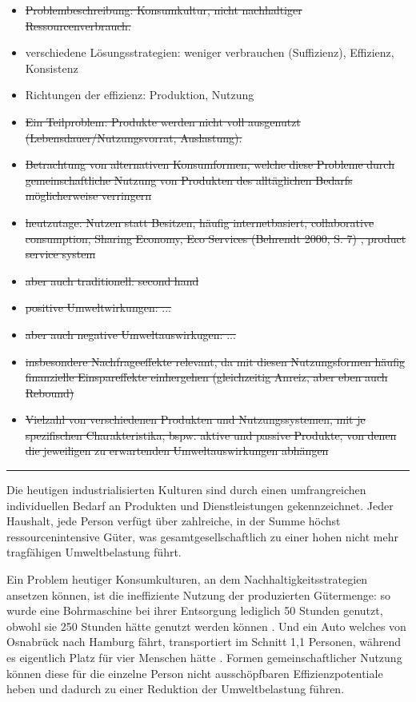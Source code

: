 \documentclass[11pt, titlepage=true]{scrartcl} %
\begin{document}
\begin{itemize}
  \item \sout{Problembeschreibung: Konsumkultur, nicht nachhaltiger
        Ressourcenverbrauch. }
  \item verschiedene Lösungsstrategien: weniger verbrauchen (Suffizienz),
    Effizienz, Konsistenz 
  \item Richtungen der effizienz: Produktion, Nutzung
  \item \sout{Ein Teilproblem: Produkte werden nicht voll ausgenutzt
    (Lebensdauer/Nutzungsvorrat, Auslastung).  }
  \item \sout{Betrachtung von alternativen Konsumformen, welche diese
      Probleme durch
      gemeinschaftliche Nutzung von Produkten des alltäglichen Bedarfs
    möglicherweise verringern}
  \item \sout{heutzutage: Nutzen statt Besitzen, häufig internetbasiert,
      collaborative
      consumption, Sharing Economy, Eco Services (Behrendt 2000, S. 7) ,
    product service system }
  \item \sout{aber auch traditionell: second hand}
  \item \sout{positive Umweltwirkungen: ...  }
  \item \sout{aber auch negative Umweltauswirkugen: ...  }
  \item \sout{insbesondere Nachfrageeffekte relevant, da mit
      diesen Nutzungsformen häufig finanzielle Einspareffekte einhergehen
    (gleichzeitig Anreiz, aber eben auch Rebound)}
  \item \sout{Vielzahl von verschiedenen Produkten und Nutzungssystemen,
      mit je spezifischen Charakteristika, bspw. aktive und passive
      Produkte, von denen die jeweiligen zu erwartenden Umweltauswirkungen
    abhängen}
      \end{itemize}
\hrule

Die heutigen industrialisierten Kulturen sind durch einen umfrangreichen
individuellen Bedarf an Produkten und Dienstleistungen gekennzeichnet. Jeder
Haushalt, jede Person verfügt über zahlreiche, in der Summe höchst
ressourcenintensive Güter, was gesamtgesellschaftlich zu einer hohen nicht mehr
tragfähigen Umweltbelastung führt.

Ein Problem heutiger Konsumkulturen, an dem Nachhaltigkeitsstrategien ansetzen
können, ist die ineffiziente Nutzung der produzierten Gütermenge: so wurde eine
Bohrmaschine bei ihrer Entsorgung lediglich 50 Stunden genutzt, obwohl sie 250
Stunden hätte genutzt werden können . Und ein
Auto welches von Osnabrück nach Hamburg fährt, transportiert im Schnitt 1,1
Personen, während es eigentlich Platz für vier Menschen hätte . Formen gemeinschaftlicher Nutzung können diese für die einzelne
Person nicht ausschöpfbaren Effizienzpotentiale heben und dadurch zu einer
Reduktion der Umweltbelastung führen.
\end{document}
